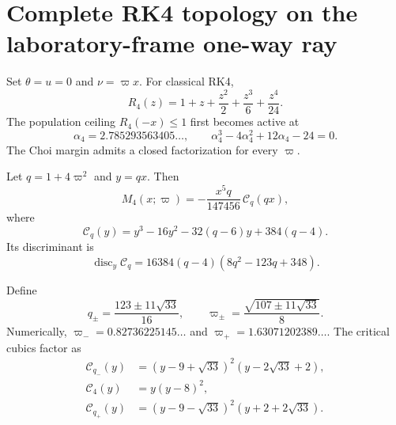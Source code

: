 \section{Complete RK4 topology on the laboratory-frame one-way ray}
\label{sec:rk4topology}

Set $\theta=u=0$ and $\nu=\varpi x$. For classical RK4,
\begin{equation}
 R_4(z)=1+z+\frac{z^2}{2}+\frac{z^3}{6}+\frac{z^4}{24}.
\end{equation}
The population ceiling $R_4(-x)\le1$ first becomes active at
\begin{equation}
 \alpha_4=2.785293563405\ldots,
 \qquad
 \alpha_4^3-4\alpha_4^2+12\alpha_4-24=0.
 \label{eq:alpha4}
\end{equation}
The Choi margin admits a closed factorization for every $\varpi$.

\begin{proposition}
\label{prop:rk4factor}
Let $q=1+4\varpi^2$ and $y=qx$. Then
\begin{equation}
 M_4(x;\varpi)=-\frac{x^5q}{147456}\,\mathcal C_q(qx),
 \label{eq:rk4_factor}
\end{equation}
where
\begin{equation}
 \mathcal C_q(y)=y^3-16y^2-32(q-6)y+384(q-4).
 \label{eq:rk4_cubic}
\end{equation}
Its discriminant is
\begin{equation}
 \operatorname{disc}_y\mathcal C_q
 =16384(q-4)(8q^2-123q+348).
 \label{eq:cubic_discriminant}
\end{equation}
\end{proposition}

Define
\begin{equation}
 q_\pm=\frac{123\pm11\sqrt{33}}{16},
 \qquad
 \varpi_\pm=\frac{\sqrt{107\pm11\sqrt{33}}}{8}.
 \label{eq:qcrit}
\end{equation}
Numerically, $\varpi_-=0.82736225145\ldots$ and $\varpi_+=1.63071202389\ldots$. The critical cubics factor as
\begin{align}
 \mathcal C_{q_-}(y)&=(y-9+\sqrt{33})^2(y-2\sqrt{33}+2),\nonumber\\
 \mathcal C_{4}(y)&=y(y-8)^2,\nonumber\\
 \mathcal C_{q_+}(y)&=(y-9-\sqrt{33})^2(y+2+2\sqrt{33}).
 \label{eq:critical_cubics}
\end{align}


